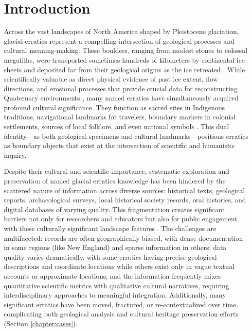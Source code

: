 \chapter{Introduction}
\label{chapter:intro}

Across the vast landscapes of North America shaped by Pleistocene glaciation, glacial erratics represent a compelling intersection of geological processes and cultural meaning-making. These boulders, ranging from modest stones to colossal megaliths, were transported sometimes hundreds of kilometers by continental ice sheets and deposited far from their geological origins as the ice retreated \cite{Flint1971, Benn2010}. While scientifically valuable as direct physical evidence of past ice extent, flow directions, and erosional processes that provide crucial data for reconstructing Quaternary environments \cite{Cuffey2010}, many named erratics have simultaneously acquired profound cultural significance. They function as sacred sites in Indigenous traditions, navigational landmarks for travelers, boundary markers in colonial settlements, sources of local folklore, and even national symbols \cite{Seelye1997, Lenik2009, Dempsey1997}. This dual identity—as both geological specimens and cultural landmarks—positions erratics as boundary objects that exist at the intersection of scientific and humanistic inquiry.

Despite their cultural and scientific importance, systematic exploration and preservation of named glacial erratics knowledge has been hindered by the scattered nature of information across diverse sources: historical texts, geological reports, archaeological surveys, local historical society records, oral histories, and digital databases of varying quality. This fragmentation creates significant barriers not only for researchers and educators but also for public engagement with these culturally significant landscape features \cite{Gregory2013}. The challenges are multifaceted: records are often geographically biased, with dense documentation in some regions (like New England) and sparse information in others; data quality varies dramatically, with some erratics having precise geological descriptions and coordinate locations while others exist only in vague textual accounts or approximate locations; and the information frequently mixes quantitative scientific metrics with qualitative cultural narratives, requiring interdisciplinary approaches to meaningful integration. Additionally, many significant erratics have been moved, fractured, or re-contextualized over time, complicating both geological analysis and cultural heritage preservation efforts (Section \ref{chapter:cases}).

